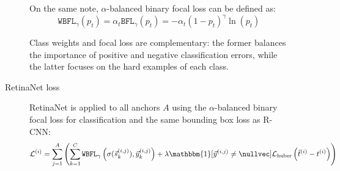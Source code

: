 \begin{description}
\begin{description}
                On the same note, $\alpha$-balanced binary focal loss can be defined as:
                \[ \texttt{WBFL}_\gamma(p_t) = \alpha_t \texttt{BFL}_\gamma(p_t) = -\alpha_t (1-p_t)^\gamma \ln(p_t) \]

                \begin{remark}
                    Class weights and focal loss are complementary: the former balances the importance of positive and negative classification errors, while the latter focuses on the hard examples of each class.
                \end{remark}

            \item[RetinaNet loss]
                RetinaNet is applied to all anchors $A$ using the $\alpha$-balanced binary focal loss for classification and the same bounding box loss as R-CNN:
                \[ \mathcal{L}^{(i)} = \sum_{j=1}^{A} \left( \sum_{k=1}^{C} \texttt{WBFL}_\gamma\left( \sigma(\vec{s}_k^{(i, j)}), \vec{y}_k^{(i, j)} \right) + \lambda \mathbbm{1}[\vec{y}^{(i, j)} \neq \nullvec] \mathcal{L}_\text{huber}\left(\hat{t}^{(i)} - t^{(i)} \right) \right) \]


\end{description}
\end{description}
